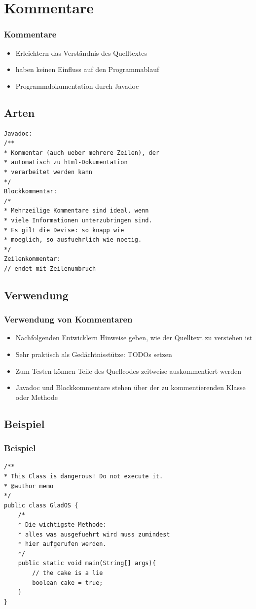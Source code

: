 \documentclass[final]{beamer}
\begin{document}
\section{Kommentare}
\begin{frame}
	\frametitle{Kommentare}
	\begin{itemize}
		\item{Erleichtern das Verständnis des Quelltextes}
		\item{haben keinen Einfluss auf den Programmablauf}
		\item{Programmdokumentation durch Javadoc}
	\end{itemize}
\end{frame}

\subsection{Arten}
\begin{frame}[containsverbatim]
	\begin{lstlisting}
Javadoc:
/**
* Kommentar (auch ueber mehrere Zeilen), der
* automatisch zu html-Dokumentation
* verarbeitet werden kann
*/
Blockkommentar:
/*
* Mehrzeilige Kommentare sind ideal, wenn
* viele Informationen unterzubringen sind.
* Es gilt die Devise: so knapp wie
* moeglich, so ausfuehrlich wie noetig.
*/
Zeilenkommentar:
// endet mit Zeilenumbruch
	\end{lstlisting}
\end{frame}

\subsection{Verwendung}
\begin{frame}
	\frametitle{Verwendung von Kommentaren}
	\begin{itemize}
		\item{Nachfolgenden Entwicklern Hinweise geben, wie der Quelltext zu verstehen ist}
		\item{Sehr praktisch als Gedächtnisstütze: TODOs setzen}
		\item{Zum Testen können Teile des Quellcodes zeitweise auskommentiert werden}
		\item{Javadoc und Blockkommentare stehen über der zu kommentierenden Klasse oder Methode}
	\end{itemize}
\end{frame}

\subsection{Beispiel}
\begin{frame}[containsverbatim]
\frametitle{Beispiel}
	\begin{lstlisting}
/**
* This Class is dangerous! Do not execute it.
* @author memo
*/
public class GladOS {
	/*
	* Die wichtigste Methode: 
	* alles was ausgefuehrt wird muss zumindest 
	* hier aufgerufen werden.
	*/
	public static void main(String[] args){
		// the cake is a lie
		boolean cake = true;
	}
}

	\end{lstlisting}
\end{frame}
\end{document}
